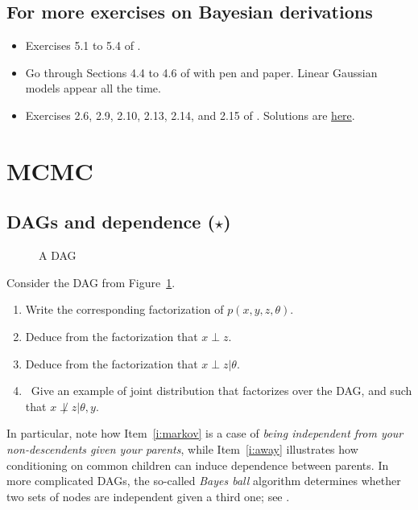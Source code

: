 \documentclass{article}
\begin{document}
 \subsection{For more exercises on Bayesian derivations}
 \begin{itemize}
   \item Exercises 5.1 to 5.4 of \citep{Mur12}.
   \item Go through Sections 4.4 to 4.6 of \citep{Mur12} with pen and paper. Linear Gaussian models appear all the time.
   \item Exercises 2.6, 2.9, 2.10, 2.13, 2.14, and 2.15 of \citep{MaRo07}. Solutions are \href{https://arxiv.org/abs/0910.4696}{here}.
 \end{itemize}

\section{MCMC}

\subsection{DAGs and dependence ($\star$)}
\begin{figure}
  \centering
\caption{A DAG}
\label{f:dag}
\end{figure}

Consider the DAG from Figure~\ref{f:dag}.
\begin{enumerate}
\item Write the corresponding factorization of $p(x,y,z,\theta)$.
\item Deduce from the factorization that $x\perp z$.
\item\label{i:markov} Deduce from the factorization that $x\perp z\vert\theta$.
\item\label{i:away} Give an example of joint distribution that factorizes over the DAG, and such that $x\not\perp z\vert \theta, y$.
\end{enumerate}
In particular, note how Item~\ref{i:markov} is a case of \emph{being independent from your non-descendents given your parents}, while Item~\ref{i:away} illustrates how conditioning on common children can induce dependence between parents. In more complicated DAGs, the so-called \emph{Bayes ball} algorithm determines whether two sets of nodes are independent given a third one; see \cite[Section 10.5]{Mur12}.
\end{document}
